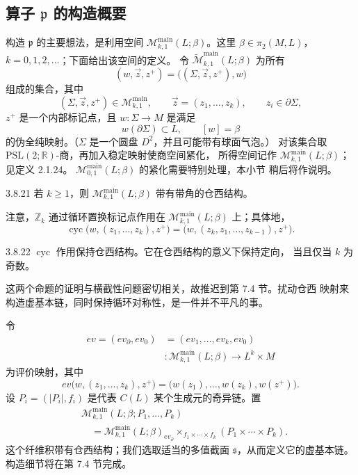 
\subsection{算子 $\mathfrak p$ 的构造概要}
\label{subsec:3-8-3}

构造 $\mathfrak p$ 的主要想法，是利用空间
$\mathcal M_{k,1}^{\mathrm{main}}(L;\beta)$。这里
$\beta\in\pi_2(M,L)$，$k=0,1,2,\ldots$；下面给出该空间的定义。
令 $\widetilde{\mathcal M}_{k,1}^{\mathrm{main}}(L;\beta)$ 为所有
\[
 (w,\vec z,z^+)=\bigl((\Sigma,\vec z,z^+),w\bigr)
\]
组成的集合，其中
\[
 (\Sigma,\vec z,z^+)\in\mathcal M_{k,1}^{\mathrm{main}},
 \qquad
 \vec z=(z_1,\ldots,z_k),\qquad
 z_i\in\partial\Sigma,
\]
$z^+$ 是一个内部标记点，且
$w\colon\Sigma\to M$ 是满足
\[
 w(\partial\Sigma)\subset L,\qquad [w]=\beta
\]
的伪全纯映射。（$\Sigma$ 是一个圆盘 $D^2$，并且可能带有球面气泡。）
对该集合取 $\mathrm{PSL}(2;\mathbb R)$-商，再加入稳定映射使商空间紧化，
所得空间记作
$\mathcal M_{k,1}^{\mathrm{main}}(L;\beta)$；见定义 2.1.24。
$\mathcal M_{0,1}^{\mathrm{main}}(L;\beta)$ 的紧化需要特别处理，本小节
稍后将作说明。

\begin{proposition}{3.8.21}\label{prop:3-8-21}
若 $k\geq1$，则
$\mathcal M_{k,1}^{\mathrm{main}}(L;\beta)$ 带有带角的仓西结构。
\end{proposition}

注意，$\mathbb Z_k$ 通过循环置换标记点作用在
$\mathcal M_{k,1}^{\mathrm{main}}(L;\beta)$ 上；具体地，
\[
 \operatorname{cyc}
 \bigl(w,(z_1,\ldots,z_k),z^+\bigr)
 =
 \bigl(w,(z_k,z_1,\ldots,z_{k-1}),z^+\bigr).
\]

\begin{proposition}{3.8.22}\label{prop:3-8-22}
$\operatorname{cyc}$ 作用保持仓西结构。它在仓西结构的意义下保持定向，
当且仅当 $k$ 为奇数。
\end{proposition}

这两个命题的证明与横截性问题密切相关，故推迟到第 7.4 节。扰动仓西
映射来构造虚基本链，同时保持循环对称性，是一件并不平凡的事。

令
\[
\begin{aligned}
 ev=(ev_\partial,ev_0)
 &=(ev_1,\ldots,ev_k,ev_0)\\
 &\colon
 \mathcal M_{k,1}^{\mathrm{main}}(L;\beta)
 \longrightarrow L^k\times M
\end{aligned}
\]
为评价映射，其中
\[
 ev\bigl(w,(z_1,\ldots,z_k),z^+\bigr)
 =
 \bigl(w(z_1),\ldots,w(z_k),w(z^+)\bigr).
\]
设 $P_i=(|P_i|,f_i)$ 是代表 $C(L)$ 某个生成元的奇异链。置
\[
\begin{aligned}
 &\mathcal M_{k,1}^{\mathrm{main}}
 (L;\beta;P_1,\ldots,P_k)\\
 &\quad=
 \mathcal M_{k,1}^{\mathrm{main}}(L;\beta)_{ev_\partial}
 \mathbin{\times_{f_1\times\cdots\times f_k}}
 (P_1\times\cdots\times P_k).
\end{aligned}
\]
这个纤维积带有仓西结构；我们选取适当的多值截面
$\mathfrak s$，从而定义它的虚基本链。构造细节将在第 7.4 节完成。

